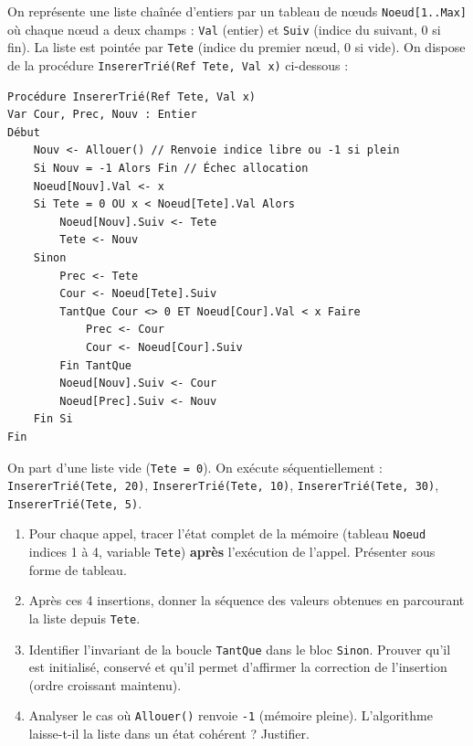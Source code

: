 \documentclass[11pt]{article}
\begin{document}
\begin{exercice}
On représente une liste chaînée d'entiers par un tableau de nœuds \texttt{Noeud[1..Max]} où chaque nœud a deux champs : \texttt{Val} (entier) et \texttt{Suiv} (indice du suivant, 0 si fin). La liste est pointée par \texttt{Tete} (indice du premier nœud, 0 si vide). On dispose de la procédure \texttt{InsererTrié(Ref Tete, Val x)} ci-dessous :

\begin{verbatim}
Procédure InsererTrié(Ref Tete, Val x)
Var Cour, Prec, Nouv : Entier
Début
    Nouv <- Allouer() // Renvoie indice libre ou -1 si plein
    Si Nouv = -1 Alors Fin // Échec allocation
    Noeud[Nouv].Val <- x
    Si Tete = 0 OU x < Noeud[Tete].Val Alors
        Noeud[Nouv].Suiv <- Tete
        Tete <- Nouv
    Sinon
        Prec <- Tete
        Cour <- Noeud[Tete].Suiv
        TantQue Cour <> 0 ET Noeud[Cour].Val < x Faire
            Prec <- Cour
            Cour <- Noeud[Cour].Suiv
        Fin TantQue
        Noeud[Nouv].Suiv <- Cour
        Noeud[Prec].Suiv <- Nouv
    Fin Si
Fin
\end{verbatim}

On part d'une liste vide (\texttt{Tete = 0}). On exécute séquentiellement :
\texttt{InsererTrié(Tete, 20)}, \texttt{InsererTrié(Tete, 10)}, \texttt{InsererTrié(Tete, 30)}, \texttt{InsererTrié(Tete, 5)}.
\begin{enumerate}
    \item Pour chaque appel, tracer l'état complet de la mémoire (tableau \texttt{Noeud} indices 1 à 4, variable \texttt{Tete}) \textbf{après} l'exécution de l'appel. Présenter sous forme de tableau.
    \item Après ces 4 insertions, donner la séquence des valeurs obtenues en parcourant la liste depuis \texttt{Tete}.
    \item Identifier l'invariant de la boucle \texttt{TantQue} dans le bloc \texttt{Sinon}. Prouver qu'il est initialisé, conservé et qu'il permet d'affirmer la correction de l'insertion (ordre croissant maintenu).
    \item Analyser le cas où \texttt{Allouer()} renvoie \texttt{-1} (mémoire pleine). L'algorithme laisse-t-il la liste dans un état cohérent ? Justifier.
\end{enumerate}
\end{exercice}
\end{document}

